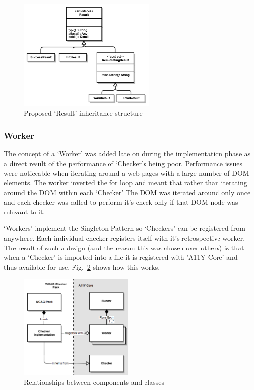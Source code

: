 \begin{figure}[H]
\centering
\includegraphics[width=0.6\textwidth]{figures/a11y_tool_result}
\captionsetup{justification=centering}
\caption{Proposed `Result' inheritance structure
\label{fig:result_design}}
\end{figure}

\subsubsection{Worker}
The concept of a `Worker' was added late on during the implementation phase as a
direct result of the performance of `Checker's being poor. Performance issues
were noticeable when iterating around a web pages with a large number of DOM
elements. The worker inverted the for loop and meant that
rather than iterating around the DOM within each `Checker' The DOM was
iterated around only once and each checker was called to perform it's check
only if that DOM node was relevant to it.

`Workers' implement the Singleton Pattern so `Checkers' can be registered from
anywhere. Each individual checker registers itself with it's retrospective
worker. The result of such a design (and the reason this was chosen over others)
is that when a `Checker' is imported into a file it is registered with 'A11Y
Core' and thus available for use. Fig.~\ref{fig:a11y_tool_worker_design}
shows how this works.

\begin{figure}[H]
\centering
\includegraphics[width=0.5\textwidth]{figures/a11y_tool_worker_design}
\captionsetup{justification=centering}
\caption{Relationships between components and classes
\label{fig:a11y_tool_worker_design}}
\end{figure}

